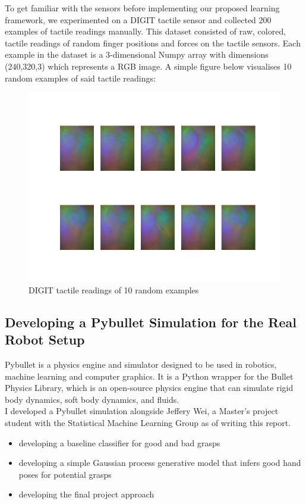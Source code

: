 \documentclass[a4paper]{report}
\theoremstyle{definition}
\begin{document}
To get familiar with the sensors before implementing our proposed learning framework, we experimented on a DIGIT tactile sensor and collected 200 examples of tactile readings manually. This dataset consisted of raw, colored, tactile readings of random finger positions and forces on the tactile sensors. Each example in the dataset is a 3-dimensional Numpy array with dimensions (240,320,3) which represents a RGB image. A simple figure below visualises 10 random examples of said tactile readings:
\begin{figure}[H]
    \centering
    \includegraphics[scale=0.4]{docs/Project Report/Media/digit_frames.png}
    \caption{DIGIT tactile readings of 10 random examples}
    \label{fig:digit\_readings}
\end{figure}

\subsection{Developing a Pybullet Simulation for the Real Robot Setup}
Pybullet \cite{pybullet} is a physics engine and simulator designed to be used in robotics, machine learning and computer graphics. It is a Python wrapper for the Bullet Physics Library, which is an open-source physics engine that can simulate rigid body dynamics, soft body dynamics, and fluids.\\

I developed a Pybullet simulation alongside Jeffery Wei, a Master's project student with the Statistical Machine Learning Group as of writing this report.

\begin{itemize}
    \item developing a baseline classifier for good and bad grasps
    \item developing a simple Gaussian process generative model that infers good hand poses for potential grasps
    \item developing the final project approach
\end{itemize}
\end{document}

